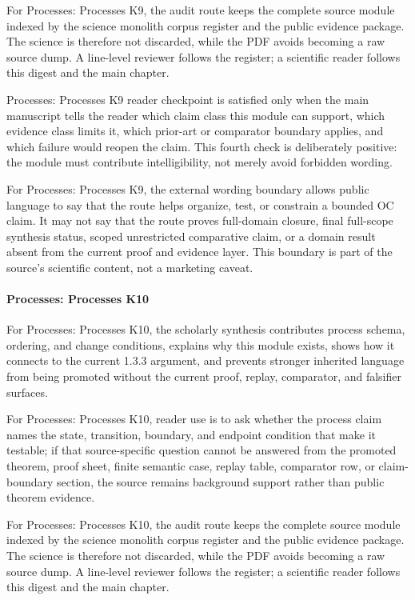 For Processes: Processes K9, the audit route keeps the complete source module indexed by the science monolith corpus register and the public evidence package. The science is therefore not discarded, while the PDF avoids becoming a raw source dump. A line-level reviewer follows the register; a scientific reader follows this digest and the main chapter.


Processes: Processes K9 reader checkpoint is satisfied only when the main manuscript tells the reader which claim class this module can support, which evidence class limits it, which prior-art or comparator boundary applies, and which failure would reopen the claim. This fourth check is deliberately positive: the module must contribute intelligibility, not merely avoid forbidden wording.


For Processes: Processes K9, the external wording boundary allows public language to say that the route helps organize, test, or constrain a bounded OC claim. It may not say that the route proves full-domain closure, final full-scope synthesis status, scoped unrestricted comparative claim, or a domain result absent from the current proof and evidence layer. This boundary is part of the source's scientific content, not a marketing caveat.


\paragraph{Processes: Processes K10}

For Processes: Processes K10, the scholarly synthesis contributes process schema, ordering, and change conditions, explains why this module exists, shows how it connects to the current 1.3.3 argument, and prevents stronger inherited language from being promoted without the current proof, replay, comparator, and falsifier surfaces.


For Processes: Processes K10, reader use is to ask whether the process claim names the state, transition, boundary, and endpoint condition that make it testable; if that source-specific question cannot be answered from the promoted theorem, proof sheet, finite semantic case, replay table, comparator row, or claim-boundary section, the source remains background support rather than public theorem evidence.


For Processes: Processes K10, the audit route keeps the complete source module indexed by the science monolith corpus register and the public evidence package. The science is therefore not discarded, while the PDF avoids becoming a raw source dump. A line-level reviewer follows the register; a scientific reader follows this digest and the main chapter.


